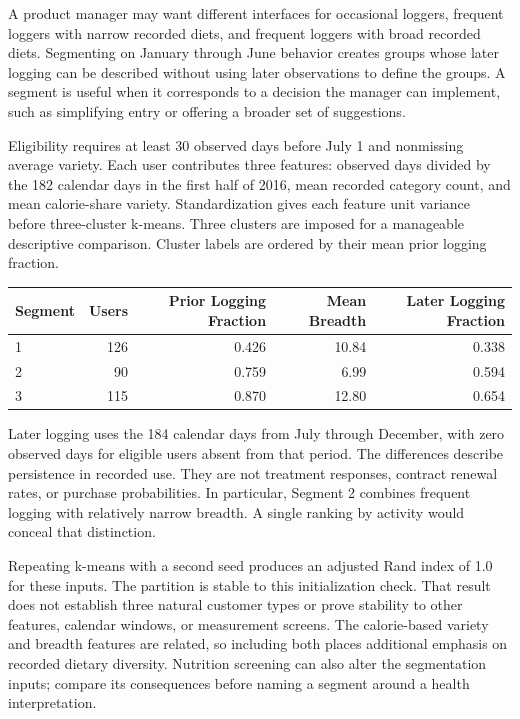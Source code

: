 \noindent A product manager may want different interfaces for occasional loggers,
frequent loggers with narrow recorded diets, and frequent loggers with
broad recorded diets. Segmenting on January through June behavior
creates groups whose later logging can be described without using later
observations to define the groups. A segment is useful when it
corresponds to a decision the manager can implement, such as simplifying
entry or offering a broader set of suggestions.

Eligibility requires at least 30 observed days before July 1 and
nonmissing average variety. Each user contributes three features:
observed days divided by the 182 calendar days in the first half of
2016, mean recorded category count, and mean calorie-share variety.
Standardization gives each feature unit variance before three-cluster
k-means. Three clusters are imposed for a manageable descriptive
comparison. Cluster labels are ordered by their mean prior logging
fraction.

\begin{table}[H]
\centering\small
\begin{tabular}{@{}lrrrr@{}}
\toprule
Segment & Users & Prior Logging Fraction & Mean Breadth & Later Logging
Fraction \\
\midrule

1 & 126 & 0.426 & 10.84 & 0.338 \\
2 & 90 & 0.759 & 6.99 & 0.594 \\
3 & 115 & 0.870 & 12.80 & 0.654 \\
\bottomrule
\end{tabular}
\end{table}

Later logging uses the 184 calendar days from July through December,
with zero observed days for eligible users absent from that period. The
differences describe persistence in recorded use. They are not treatment
responses, contract renewal rates, or purchase probabilities. In
particular, Segment 2 combines frequent logging with relatively narrow
breadth. A single ranking by activity would conceal that distinction.

Repeating k-means with a second seed produces an adjusted Rand index of
1.0 for these inputs. The partition is stable to this initialization
check. That result does not establish three natural customer types or
prove stability to other features, calendar windows, or measurement
screens. The calorie-based variety and breadth features are related, so
including both places additional emphasis on recorded dietary diversity.
Nutrition screening can also alter the segmentation inputs; compare its
consequences before naming a segment around a health interpretation.

